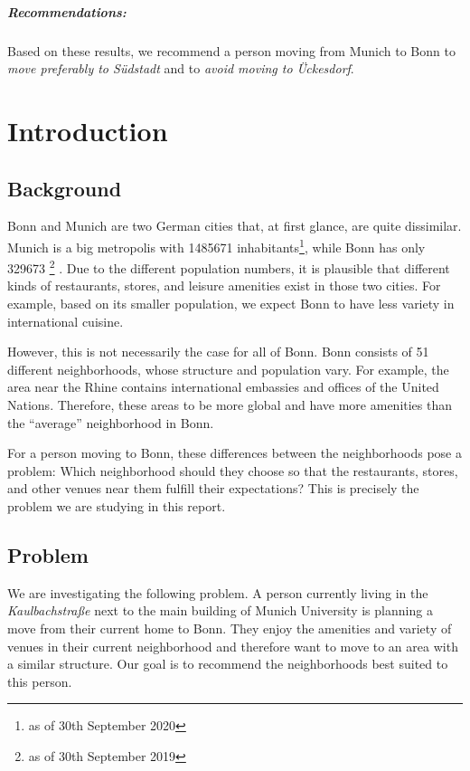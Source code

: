 \documentclass[UKenglish]{scrreprt}
\begin{document}
\paragraph{Recommendations:}Based on these results, we recommend a person moving from Munich to Bonn to \emph{move preferably to Südstadt} and to \emph{avoid moving to Ückesdorf}.


\tableofcontents
\clearpage



\chapter{Introduction}
\section{Background}
Bonn and Munich are two German cities that, at first glance, are quite dissimilar. Munich is a big metropolis with \num{1485671} inhabitants\footnote{as of 30th September 2020 }\cite{muenchen}, while Bonn has only \num{329673} \footnote{as of 30th September 2019}
\cite{bonn}. Due to the different population numbers, it is plausible that different kinds of restaurants, stores, and leisure amenities exist in those two cities. For example, based on its smaller population, we expect Bonn to have less variety in international cuisine. 

However, this is not necessarily the case for all of Bonn. Bonn consists of 51 different neighborhoods, whose structure and population vary. For example, the area near the Rhine contains international embassies and offices of the United Nations. Therefore, these areas to be more global and have more amenities than the \enquote{average} neighborhood in Bonn.

For a person moving to Bonn, these differences between the neighborhoods pose a problem: Which neighborhood should they choose so that the restaurants, stores, and other venues near them fulfill their expectations? This is precisely the problem we are studying in this report.

\section{Problem}
We are investigating the following problem. A person currently living in the \emph{Kaulbachstraße} next to the main building of Munich University is planning a move from their current home to Bonn. They enjoy the amenities and variety of venues in their current neighborhood and therefore want to move to an area with a similar structure. Our goal is to recommend the neighborhoods best suited to this person. 
\end{document}
